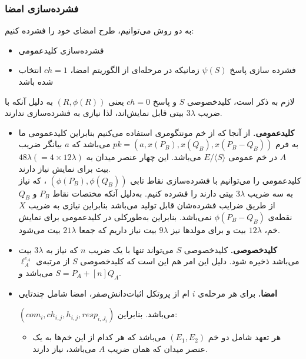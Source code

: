 \subsubsection{فشرده‌سازی امضا}

به دو روش می‌توانیم، طرح امضای خود را فشرده کنیم:
\begin{itemize}
\item{
فشرده‌سازی کلیدعمومی	
}

\item{
فشرده سازی پاسخ
$\psi(S)$
زمانیکه در مرحله‌ای از الگوریتم امضا،
$ch=1$
انتخاب شده باشد
}
\end{itemize}
لازم به ذکر است، کلیدخصوصی
$S$
 و پاسخ 
$ch = 0$
 یعنی
$(R,\phi(R))$
به دلیل آنکه با ضریب
$3 \lambda$
بیتی قابل نمایش‌اند، لذا نیازی به فشرده‌سازی ندارند.
\\
\begin{itemize}
\item{\textbf{کلیدعمومی. }}
از آنجا که از خم مونتگومری استفاده می‌کنیم بنابراین کلیدعمومی ما به فرم
$pk = (a, x(P_B), x(Q_B), x(P_B-Q_B))$
می‌باشد که 
$a$
بیانگر ضریب
$A$
 در خم عمومی 
 $E / \langle S \rangle$
 می‌باشد. این چهار عنصر میدان به
 $48 \lambda (= 4 \times 12 \lambda)$
 بیت برای ‌نمایش نیاز دارند.	
\\ 
 کلیدعمومی را می‌توانیم با فشرده‌سازی نقاط تابی
 $(\phi({P_B}) , \phi({Q_B}) )$
، که نیاز به سه ضریب
$3 \lambda$
بیتی دارند را فشرده کنیم.
به‌دلیل آنکه مختصات نقاط
$P_B$
و
$Q_B$
از طریق ضرایب فشرده‌شان قابل تولید می‌باشد بنابراین
نیازی به ضریب
$X$
نقطه‌ی
$\phi(P_B-Q_B)$
نمی‌باشد. 
بنابراین به‌طورکلی در کلیدعمومی برای نمایش خم،
$12\lambda$
بیت و برای مولدها نیز
$9 \lambda$
بیت نیاز داریم که جمعا 
$21 \lambda$
بیت می‌شود.
\item{\textbf{کلیدخصوصی.}}
کلیدخصوصی
$S$
می‌تواند تنها با یک ضریب
$n$
که نیاز به
$3 \lambda$
بیت می‌باشد ذخیره شود. دلیل این امر هم این است که کلیدخصوصی
$S$
از مرتبه‌ی
$\ell_A^{e_A}$
می‌باشد و 
$ S = P_A + [n] Q_A $.
\item{\textbf{امضا.}} 
برای هر مرحله‌ی
$i$
ام از پروتکل اثبات‌دانش‌صفر، امضا شامل چندتایی

$(com_i, ch_{i,j}, h_{i,j}, resp_{i,J_i})$
می‌باشد. بنابراین:
\begin{itemize}
\item{
	هر تعهد شامل دو خم
	$(E_1,E_2)$
	می‌باشد که هر کدام از این خم‌ها به یک عنصر میدان که همان ضریب 
	$A$
	می‌باشد، نیاز دارند.

}
\end{itemize}
\end{itemize}
